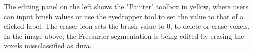 \label{fig:edit}
The editing panel on the left shows the "Painter" toolbox in yellow, where users can input brush values or use the eyedropper tool to set the value to that of a clicked label. The eraser icon sets the brush value to 0, to delete or erase voxels. In the image above, the Freesurfer segmentation is being edited by erasing the voxels missclassified as dura. 